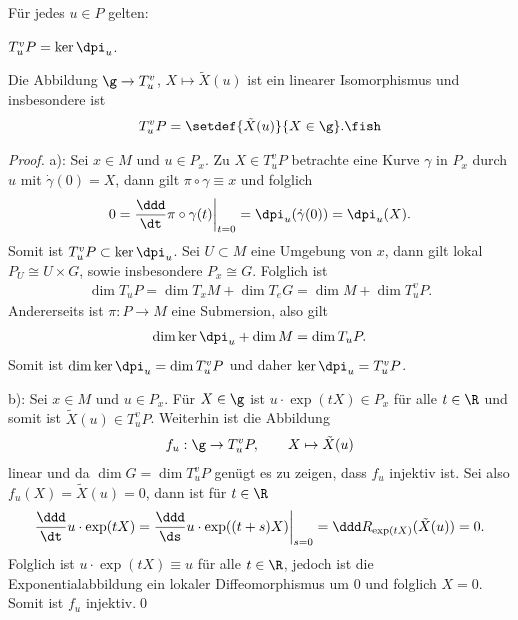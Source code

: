 \documentclass[%
	paper=a5,%
	fleqn,%
	DIV=18,%
	BCOR=0mm,
	fontsize=11pt,
	titlepage=false,%
	bibliography=totoc,
	DIV=18,%
	twoside=true,
	pdftitle=Riemannsche Geometrie,
	pdfauthor=Uwe Semmelmann,
	numbers=noendperiod]%
	{scrbook}
\begin{document}
\begin{prop}
Für jedes $u\in P$ gelten:
\begin{propenum}
\item $T^v_uP = \ker\dpi_u$.
\item Die Abbildung $\g\to T^v_u$, $X\mapsto \tilde{X}(u)$
ist ein linearer Isomorphismus und insbesondere ist
\begin{align*}
T^v_uP = \setdef{\tilde{X}(u)}{X\in \g}.\fish
\end{align*}
\end{propenum}
\end{prop}
\begin{proof}
a): Sei $x\in M$ und $u\in P_x$. Zu $X\in T^v_uP$ betrachte eine Kurve
$\gamma$ in $P_x$ durch $u$ mit $\dot{\gamma}(0) = X$, dann gilt
$\pi\circ\gamma \equiv x$ und folglich
\begin{align*}
0 = \frac{\ddd}{\dt}\pi\circ\gamma(t) \bigg|_{t=0}
= \dpi_u(\dot{\gamma}(0)) = \dpi_u(X).
\end{align*}
Somit ist $T^v_uP \subset \ker \dpi_u$. Sei $U\subset M$ eine Umgebung von
$x$, dann gilt lokal $P_U \cong U\times G$, sowie insbesondere $P_x\cong G$.
Folglich ist 
\begin{align*}
\dim T_uP = \dim T_x M + \dim T_e G = \dim M + \dim T^v_uP.
\end{align*}
Andererseits ist $\pi\colon P\to M$ eine Submersion, also gilt 
\begin{align*}
\dim \ker \dpi_u + \dim M = \dim T_uP.
\end{align*}
Somit ist $\dim \ker \dpi_u = \dim T^v_uP$ und daher $\ker\dpi_u = T^v_uP$.

b): Sei $x\in M$ und $u\in P_x$. Für $X\in\g$ ist $u\cdot \exp(tX) \in P_x$ für
alle $t\in\R$ und somit ist $\tilde{X}(u) \in T^v_uP$. Weiterhin ist die
Abbildung
\begin{align*}
f_u : \g\to T^v_uP,\qquad X\mapsto \tilde{X}(u) 
\end{align*}
linear und da $\dim G = \dim T^v_uP$ genügt es zu zeigen, dass $f_u$
injektiv ist. Sei also $f_u(X) = \tilde{X}(u) = 0$, dann ist für $t\in\R$
\begin{align*}
\frac{\ddd}{\dt} u\cdot \exp(tX)
=
\frac{\ddd}{\ds} u\cdot \exp((t+s)X)\bigg|_{s=0}
=
\ddd R_{\exp(tX)}(\tilde{X}(u)) = 0.
\end{align*}
Folglich ist $u\cdot \exp(tX) \equiv u$ für alle $t\in\R$, jedoch ist die
Exponentialabbildung ein lokaler Diffeomorphismus um $0$ und folglich $X=0$.
Somit ist $f_u$ injektiv.\qed
\end{proof}
\end{document}
